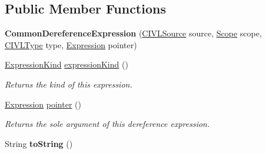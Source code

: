 \subsection*{Public Member Functions}
\begin{DoxyCompactItemize}
\item 
\hypertarget{classedu_1_1udel_1_1cis_1_1vsl_1_1civl_1_1model_1_1common_1_1expression_1_1CommonDereferenceExpression_ad08dd2c29c1a75c5da60f6bb74c612b2}{}{\bfseries Common\+Dereference\+Expression} (\hyperlink{interfaceedu_1_1udel_1_1cis_1_1vsl_1_1civl_1_1model_1_1IF_1_1CIVLSource}{C\+I\+V\+L\+Source} source, \hyperlink{interfaceedu_1_1udel_1_1cis_1_1vsl_1_1civl_1_1model_1_1IF_1_1Scope}{Scope} scope, \hyperlink{interfaceedu_1_1udel_1_1cis_1_1vsl_1_1civl_1_1model_1_1IF_1_1type_1_1CIVLType}{C\+I\+V\+L\+Type} type, \hyperlink{interfaceedu_1_1udel_1_1cis_1_1vsl_1_1civl_1_1model_1_1IF_1_1expression_1_1Expression}{Expression} pointer)\label{classedu_1_1udel_1_1cis_1_1vsl_1_1civl_1_1model_1_1common_1_1expression_1_1CommonDereferenceExpression_ad08dd2c29c1a75c5da60f6bb74c612b2}

\item 
\hyperlink{enumedu_1_1udel_1_1cis_1_1vsl_1_1civl_1_1model_1_1IF_1_1expression_1_1Expression_1_1ExpressionKind}{Expression\+Kind} \hyperlink{classedu_1_1udel_1_1cis_1_1vsl_1_1civl_1_1model_1_1common_1_1expression_1_1CommonDereferenceExpression_a2a2e34997293d63bf63d14048052b115}{expression\+Kind} ()
\begin{DoxyCompactList}\small\item\em Returns the kind of this expression. \end{DoxyCompactList}\item 
\hyperlink{interfaceedu_1_1udel_1_1cis_1_1vsl_1_1civl_1_1model_1_1IF_1_1expression_1_1Expression}{Expression} \hyperlink{classedu_1_1udel_1_1cis_1_1vsl_1_1civl_1_1model_1_1common_1_1expression_1_1CommonDereferenceExpression_a3b7f2c1bfd7bed78d5515c37f2b623d2}{pointer} ()
\begin{DoxyCompactList}\small\item\em Returns the sole argument of this dereference expression. \end{DoxyCompactList}\item 
\hypertarget{classedu_1_1udel_1_1cis_1_1vsl_1_1civl_1_1model_1_1common_1_1expression_1_1CommonDereferenceExpression_a9aab7692cd0c7b9467cb73cf3400c488}{}String {\bfseries to\+String} ()\label{classedu_1_1udel_1_1cis_1_1vsl_1_1civl_1_1model_1_1common_1_1expression_1_1CommonDereferenceExpression_a9aab7692cd0c7b9467cb73cf3400c488}


\end{DoxyCompactItemize}
